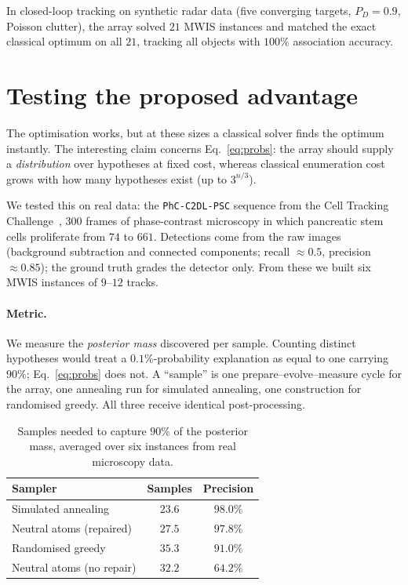 \documentclass[10pt,twocolumn]{article}
\begin{document}
In closed-loop tracking on synthetic radar data (five converging targets, $P_D =
0.9$, Poisson clutter), the array solved $21$ MWIS instances and matched the exact
classical optimum on all $21$, tracking all objects with $100\%$ association
accuracy.

\section{Testing the proposed advantage}

The optimisation works, but at these sizes a classical solver finds the optimum
instantly. The interesting claim concerns Eq.~\eqref{eq:probs}: the array should
supply a \emph{distribution} over hypotheses at fixed cost, whereas classical
enumeration cost grows with how many hypotheses exist (up to $3^{n/3}$).

We tested this on real data: the \texttt{PhC-C2DL-PSC} sequence from the Cell
Tracking Challenge~\cite{ctc}, $300$ frames of phase-contrast microscopy in which
pancreatic stem cells proliferate from $74$ to $661$. Detections come from the
raw images (background subtraction and connected components; recall $\approx
0.5$, precision $\approx 0.85$); the ground truth grades the detector only. From
these we built six MWIS instances of $9$--$12$ tracks.

\paragraph{Metric.} We measure the \emph{posterior mass} discovered per sample.
Counting distinct hypotheses would treat a $0.1\%$-probability explanation as
equal to one carrying $90\%$; Eq.~\eqref{eq:probs} does not. A ``sample'' is one
prepare--evolve--measure cycle for the array, one annealing run for simulated
annealing, one construction for randomised greedy. All three receive identical
post-processing.

\begin{table}[H]
  \centering
  \small
  \caption{Samples needed to capture $90\%$ of the posterior mass, averaged over
  six instances from real microscopy data.}
  \label{tab:route1}
  \begin{tabular}{lcc}
    \toprule
    Sampler & Samples & Precision \\
    \midrule
    Simulated annealing        & $\mathbf{23.6}$ & $98.0\%$ \\
    Neutral atoms (repaired)   & $27.5$          & $\mathbf{97.8\%}$ \\
    Randomised greedy          & $35.3$          & $91.0\%$ \\
    Neutral atoms (no repair)  & $32.2$          & $64.2\%$ \\
    \bottomrule
  \end{tabular}
\end{table}
\end{document}
